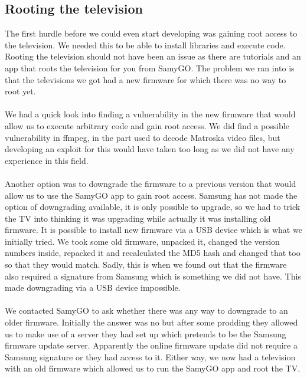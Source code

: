 \subsection{Rooting the television}
The first hurdle before we could even start developing was gaining root access to the television. We needed this to be able to install libraries and execute code. Rooting the television should not have been an issue as there are tutorials and an app that roots the television for you from SamyGO\cite{SamyGO}. The problem we ran into is that the televisions we got had a new firmware for which there was no way to root yet.
\\\\
We had a quick look into finding a vulnerability in the new firmware that would allow us to execute arbitrary code and gain root access. We did find a possible vulnerability in ffmpeg, in the part used to decode Matroska video files, but developing an exploit for this would have taken too long as we did not have any experience in this field.
\\\\
Another option was to downgrade the firmware to a previous version that would allow us to use the SamyGO app to gain root access. Samsung has not made the option of downgrading available, it is only possible to upgrade, so we had to trick the TV into thinking it was upgrading while actually it was installing old firmware. It is possible to install new firmware via a USB device which is what we initially tried. We took some old firmware, unpacked it, changed the version numbers inside, repacked it and recalculated the MD5 hash and changed that too so that they would match. Sadly, this is when we found out that the firmware also required a signature from Samsung which is something we did not have. This made downgrading via a USB device impossible.
\\\\
We contacted SamyGO to ask whether there was any way to downgrade to an older firmware. Initially the answer was no but after some prodding they allowed us to make use of a server they had set up which pretends to be the Samsung firmware update server. Apparently the online firmware update did not require a Samsung signature or they had access to it. Either way, we now had a television with an old firmware which allowed us to run the SamyGO app and root the TV.

